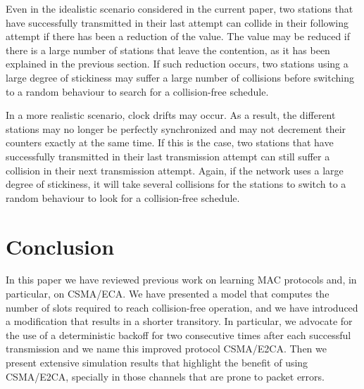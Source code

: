 \documentclass[journal]{IEEEtran}
\begin{document}
Even in the idealistic scenario considered in the current paper, two stations that have successfully transmitted in their last attempt can collide in their following attempt if there has been a reduction of the  value. The  value may be reduced if there is a large number of stations that leave the contention, as it has been explained in the previous section. If such reduction occurs, two stations using a large degree of stickiness may suffer a large number of collisions before switching to a random behaviour to search for a collision-free schedule.

In a more realistic scenario, clock drifts may occur. As a result, the different stations may no longer be perfectly synchronized and may not decrement their counters exactly at the same time. If this is the case, two stations that have successfully transmitted in their last transmission attempt can still suffer a collision in their next transmission attempt. Again, if the network uses a large degree of stickiness, it will take several collisions for the stations to switch to a random behaviour to look for a collision-free schedule.


\section{Conclusion}
\label{sec:conclusion}

In this paper we have reviewed previous work on learning MAC protocols and, in particular, on CSMA/ECA. We have presented a model that computes the number of slots required to reach collision-free operation, and we have introduced a modification that results in a shorter transitory. In particular, we advocate for the use of a deterministic backoff for two consecutive times after each successful transmission and we name this improved protocol CSMA/E2CA. Then we present extensive simulation results that highlight the benefit of using CSMA/E2CA, specially in those channels that are prone to packet errors.
\end{document}
